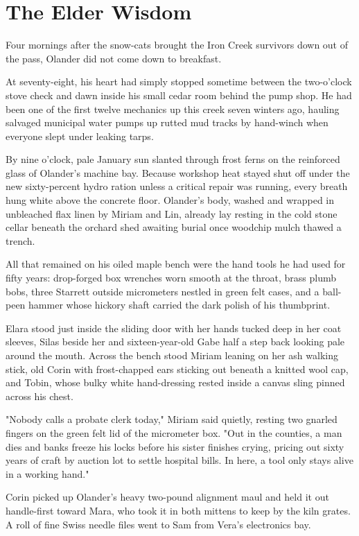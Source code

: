 \chapter{The Elder Wisdom}

Four mornings after the snow-cats brought the Iron Creek survivors down out of the pass, Olander did not come down to breakfast.

At seventy-eight, his heart had simply stopped sometime between the two-o'clock stove check and dawn inside his small cedar room behind the pump shop. He had been one of the first twelve mechanics up this creek seven winters ago, hauling salvaged municipal water pumps up rutted mud tracks by hand-winch when everyone slept under leaking tarps.

By nine o'clock, pale January sun slanted through frost ferns on the reinforced glass of Olander's machine bay. Because workshop heat stayed shut off under the new sixty-percent hydro ration unless a critical repair was running, every breath hung white above the concrete floor. Olander's body, washed and wrapped in unbleached flax linen by Miriam and Lin, already lay resting in the cold stone cellar beneath the orchard shed awaiting burial once woodchip mulch thawed a trench.

All that remained on his oiled maple bench were the hand tools he had used for fifty years: drop-forged box wrenches worn smooth at the throat, brass plumb bobs, three Starrett outside micrometers nestled in green felt cases, and a ball-peen hammer whose hickory shaft carried the dark polish of his thumbprint.

Elara stood just inside the sliding door with her hands tucked deep in her coat sleeves, Silas beside her and sixteen-year-old Gabe half a step back looking pale around the mouth. Across the bench stood Miriam leaning on her ash walking stick, old Corin with frost-chapped ears sticking out beneath a knitted wool cap, and Tobin, whose bulky white hand-dressing rested inside a canvas sling pinned across his chest.

"Nobody calls a probate clerk today," Miriam said quietly, resting two gnarled fingers on the green felt lid of the micrometer box. "Out in the counties, a man dies and banks freeze his locks before his sister finishes crying, pricing out sixty years of craft by auction lot to settle hospital bills. In here, a tool only stays alive in a working hand."

Corin picked up Olander's heavy two-pound alignment maul and held it out handle-first toward Mara, who took it in both mittens to keep by the kiln grates. A roll of fine Swiss needle files went to Sam from Vera's electronics bay.

